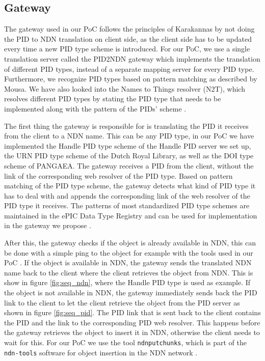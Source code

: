
\subsection{Gateway}\label{gw}
The gateway used in our PoC follows the principles of Karakannas by not doing the PID to NDN translation on client side, as the client side has to be updated every time a new PID type scheme is introduced. For our PoC, we use a single translation server called the PID2NDN gateway which implements the translation of different PID types, instead of a separate mapping server for every PID type. Furthermore, we recognize PID types based on pattern matching as described by Mousa. We have also looked into the Names to Things resolver (N2T), which resolves different PID types by stating the PID type that needs to be implemented along with the pattern of the PIDs' scheme \cite{n2t}.

The first thing the gateway is responsible for is translating the PID it receives from the client to a NDN name. This can be any PID type, in our PoC we have implemented the Handle PID type scheme of the Handle PID server we set up, the URN PID type scheme of the Dutch Royal Library, as well as the DOI type scheme of PANGAEA. The gateway receives a PID from the client, without the link of the corresponding web resolver of the PID type. Based on pattern matching of the PID type scheme, the gateway detects what kind of PID type it has to deal with and appends the corresponding link of the web resolver of the PID type it receives. 
The patterns of most standardized PID type schemes are maintained in the ePIC Data Type Registry and can be used for implementation in the gateway we propose \cite{dtr}. 

After this, the gateway checks if the object is already available in NDN, this can be done with a simple ping to the object for example with the tools used in our PoC \cite{ndn-tools}. 
If the object is available in NDN, the gateway sends the translated NDN name back to the client where the client retrieves the object from NDN. This is show in figure \ref{fig:seq_ndn}, where the Handle PID type is used as example. If the object is not available in NDN, the gateway immediately sends back the PID link to the client to 
let the client retrieve the object from the PID server as shown in figure \ref{fig:seq_pid}. The PID link that is sent back to the client contains the PID and the link to the corresponding PID web resolver. This happens before the gateway retrieves the object to insert it in NDN, otherwise the client needs to wait for this. For our PoC we use the tool \texttt{ndnputchunks}, which is part of the \texttt{ndn-tools} software for object insertion in the NDN network \cite{ndn-tools}.

